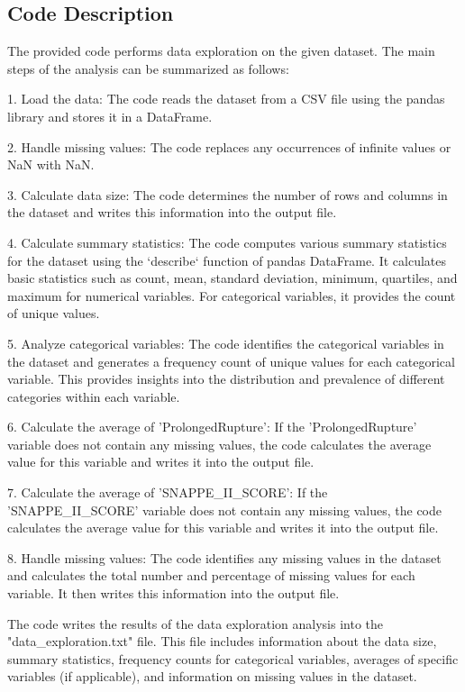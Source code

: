 \documentclass[11pt]{article}
\begin{document}
\subsection{Code Description}

The provided code performs data exploration on the given dataset. The main steps of the analysis can be summarized as follows:

1. Load the data: The code reads the dataset from a CSV file using the pandas library and stores it in a DataFrame.

2. Handle missing values: The code replaces any occurrences of infinite values or NaN with NaN.

3. Calculate data size: The code determines the number of rows and columns in the dataset and writes this information into the output file.

4. Calculate summary statistics: The code computes various summary statistics for the dataset using the `describe` function of pandas DataFrame. It calculates basic statistics such as count, mean, standard deviation, minimum, quartiles, and maximum for numerical variables. For categorical variables, it provides the count of unique values.

5. Analyze categorical variables: The code identifies the categorical variables in the dataset and generates a frequency count of unique values for each categorical variable. This provides insights into the distribution and prevalence of different categories within each variable.

6. Calculate the average of 'ProlongedRupture': If the 'ProlongedRupture' variable does not contain any missing values, the code calculates the average value for this variable and writes it into the output file.

7. Calculate the average of 'SNAPPE\_II\_SCORE': If the 'SNAPPE\_II\_SCORE' variable does not contain any missing values, the code calculates the average value for this variable and writes it into the output file.

8. Handle missing values: The code identifies any missing values in the dataset and calculates the total number and percentage of missing values for each variable. It then writes this information into the output file.

The code writes the results of the data exploration analysis into the "data\_exploration.txt" file. This file includes information about the data size, summary statistics, frequency counts for categorical variables, averages of specific variables (if applicable), and information on missing values in the dataset.
\end{document}
